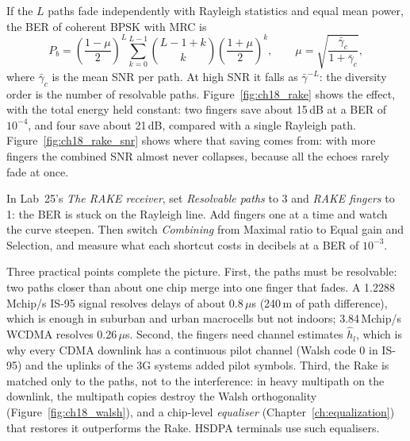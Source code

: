 If the $L$ paths fade independently with Rayleigh statistics and equal mean power, the BER of
coherent BPSK with MRC is
\begin{equation}
P_b=\left(\frac{1-\mu}{2}\right)^L\sum_{k=0}^{L-1}\binom{L-1+k}{k}\left(\frac{1+\mu}{2}\right)^k,
\qquad\mu=\sqrt{\frac{\bar\gamma_c}{1+\bar\gamma_c}},
\label{eq:ch18:rakeber}
\end{equation}
where $\bar\gamma_c$ is the mean SNR per path. At high SNR it falls as $\bar\gamma^{-L}$: the
diversity order is the number of resolvable paths. Figure~\ref{fig:ch18_rake} shows the
effect, with the total energy held constant: two fingers save about 15\,dB at a BER of
$10^{-4}$, and four save about 21\,dB, compared with a single Rayleigh path.
Figure~\ref{fig:ch18_rake_snr} shows where that saving comes from: with more fingers the
combined SNR almost never collapses, because all the echoes rarely fade at once.

\begin{tryit}
In Lab~25's \emph{The RAKE receiver}, set \emph{Resolvable paths} to 3 and \emph{RAKE fingers}
to 1: the BER is stuck on the Rayleigh line. Add fingers one at a time and watch the curve steepen.
Then switch \emph{Combining} from Maximal ratio to Equal gain and Selection, and measure what each
shortcut costs in decibels at a BER of $10^{-3}$.
\end{tryit}

Three practical points complete the picture. First, the paths must be resolvable: two
paths closer than about one chip merge into one finger that fades. A 1.2288\,Mchip/s IS-95
signal resolves delays of about 0.8\,$\mu$s (240\,m of path difference), which is enough in
suburban and urban macrocells but not indoors; 3.84\,Mchip/s WCDMA resolves 0.26\,$\mu$s.
Second, the fingers need channel estimates $\hat h_l$, which is why every CDMA downlink has a
continuous pilot channel (Walsh code 0 in IS-95) and the uplinks of the 3G systems added
pilot symbols. Third, the Rake is matched only to the paths, not to the interference: in
heavy multipath on the downlink, the multipath copies destroy the Walsh orthogonality
(Figure~\ref{fig:ch18_walsh}), and a chip-level \emph{equaliser}
(Chapter~\ref{ch:equalization}) that restores it outperforms the Rake. HSDPA terminals use
such equalisers.


